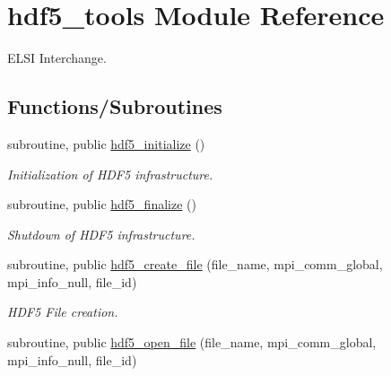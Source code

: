 \hypertarget{namespacehdf5__tools}{}\section{hdf5\+\_\+tools Module Reference}
\label{namespacehdf5__tools}


E\+L\+S\+I Interchange.  


\subsection*{Functions/\+Subroutines}
\begin{DoxyCompactItemize}
\item 
\hypertarget{namespacehdf5__tools_a0774bb98cb3cb3c0ed7497a606e76541}{}subroutine, public \hyperlink{namespacehdf5__tools_a0774bb98cb3cb3c0ed7497a606e76541}{hdf5\+\_\+initialize} ()\label{namespacehdf5__tools_a0774bb98cb3cb3c0ed7497a606e76541}

\begin{DoxyCompactList}\small\item\em Initialization of H\+D\+F5 infrastructure. \end{DoxyCompactList}\item 
\hypertarget{namespacehdf5__tools_a4eb01cf583616c455828486c208cba3d}{}subroutine, public \hyperlink{namespacehdf5__tools_a4eb01cf583616c455828486c208cba3d}{hdf5\+\_\+finalize} ()\label{namespacehdf5__tools_a4eb01cf583616c455828486c208cba3d}

\begin{DoxyCompactList}\small\item\em Shutdown of H\+D\+F5 infrastructure. \end{DoxyCompactList}\item 
\hypertarget{namespacehdf5__tools_ad63f5a0d755bd4b78f24239df042ac55}{}subroutine, public \hyperlink{namespacehdf5__tools_ad63f5a0d755bd4b78f24239df042ac55}{hdf5\+\_\+create\+\_\+file} (file\+\_\+name, mpi\+\_\+comm\+\_\+global, mpi\+\_\+info\+\_\+null, file\+\_\+id)\label{namespacehdf5__tools_ad63f5a0d755bd4b78f24239df042ac55}

\begin{DoxyCompactList}\small\item\em H\+D\+F5 File creation. \end{DoxyCompactList}\item 
\hypertarget{namespacehdf5__tools_a418c4e92ee38a97306523354c60dcc12}{}subroutine, public \hyperlink{namespacehdf5__tools_a418c4e92ee38a97306523354c60dcc12}{hdf5\+\_\+open\+\_\+file} (file\+\_\+name, mpi\+\_\+comm\+\_\+global, mpi\+\_\+info\+\_\+null, file\+\_\+id)\label{namespacehdf5__tools_a418c4e92ee38a97306523354c60dcc12}


\end{DoxyCompactItemize}
